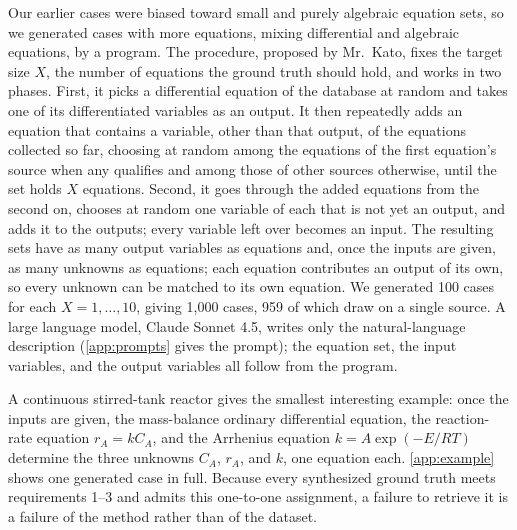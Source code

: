Our earlier cases were biased toward small and purely algebraic equation sets, so we generated
cases with more equations, mixing differential and algebraic equations, by a program. The
procedure, proposed by Mr.~Kato, fixes the target size $X$, the number of equations the ground
truth should hold, and works in two phases. First, it picks a differential equation of the
database at random and takes one of its differentiated variables as an output. It then repeatedly
adds an equation that contains a variable, other than that output, of the equations collected so
far, choosing at random among the equations of the first equation's source when any qualifies and
among those of other sources otherwise, until the set holds $X$ equations. Second, it goes through
the added equations from the second on, chooses at random one variable of each that is not yet an
output, and adds it to the outputs; every variable left over becomes an input. The resulting sets
have as many output variables as equations and, once the inputs are given, as many unknowns as
equations; each equation contributes an output of its own, so every unknown can be matched to its
own equation.
We generated 100 cases for each $X = 1, \dots, 10$, giving 1,000 cases, 959 of which draw on a
single source. A large language model, Claude Sonnet 4.5\cite{ClaudeSonnet45}, writes only the
natural-language description (\ref{app:prompts} gives the prompt); the equation set, the
input variables, and the output variables all follow from the program.

A continuous stirred-tank reactor gives the smallest interesting example: once the inputs are
given, the mass-balance ordinary differential equation, the reaction-rate equation $r_A = k C_A$,
and the Arrhenius equation $k = A \exp(-E / RT)$ determine the three unknowns $C_A$, $r_A$, and $k$,
one equation each. \ref{app:example} shows one generated case in full. Because every
synthesized ground truth meets requirements 1--3 and admits this one-to-one assignment, a failure
to retrieve it is a failure of the method rather than of the dataset.

